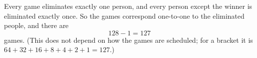 Every game eliminates exactly one person, and every person except the winner is eliminated exactly once. So the games correspond one-to-one to the eliminated people, and there are
\[128-1=\boxed{127}\]
games. (This does not depend on how the games are scheduled; for a bracket it is $64+32+16+8+4+2+1=127$.)
